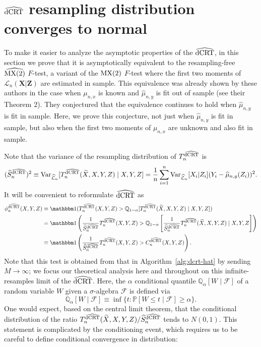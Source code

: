 \documentclass[aos]{imsart}
\theoremstyle{plain}
\theoremstyle{remark}
\newcommand{\V}{\mathrm{Var}}							%
\renewcommand{\P}{\mathbb{P}}							%
\newcommand{\Q}{\mathbb{Q}}								%
\newcommand{\indicator}{\mathbbm 1}						%
\newcommand{\prx}{\bm X}								%
\newcommand{\srx}{X}									%
\newcommand{\prz}{\bm Z}								%
\newcommand{\srz}{Z}									%
\newcommand{\srxk}{\widetilde X}						%
\newcommand{\sry}{Y}									%
\newcommand{\law}{\mathcal L}							%
\newcommand{\lawhat}{\widehat{\mathcal L}}				%
\newcommand{\dCRThat}{\widehat{\textnormal{dCRT}}}		%
\newcommand{\MXtwohat}{\widehat{\textnormal{MX(2)}}}		%
\newcommand{\MXtwo}{\textnormal{MX(2)}}                 %
\begin{document}
\section{$\dCRThat$ resampling distribution converges to normal} \label{sec:conv-to-normal}

To make it easier to analyze the asymptotic properties of the $\dCRThat$, in this section we prove that it is asymptotically equivalent to the resampling-free $\MXtwohat$ $F$-test, a variant of the $\MXtwo$ $F$-test \citep{Katsevich2020a} where the first two moments of $\law_n(\prx|\prz)$ are estimated in sample. This equivalence was already shown by these authors in the case when $\mu_{n,x}$ is known and $\widehat \mu_{n,y}$ is fit out of sample (see their Theorem 2). They conjectured that the equivalence continues to hold when $\widehat \mu_{n,y}$ is fit in sample. Here, we prove this conjecture, not just when $\widehat \mu_{n,y}$ is fit in sample, but also when the first two moments of $\mu_{n,x}$ are unknown and also fit in sample.

Note that the variance of the resampling distribution of $T_n^{\dCRThat}$ is
\begin{equation}
    (\widehat S_{n}^{\dCRThat})^2 \equiv \V_{\lawhat_n}[T_n^{\dCRThat}(\srxk, \srx, \sry, \srz) \mid \srx, \sry, \srz] = \frac{1}{n}\sum_{i = 1}^n \V_{\lawhat_n}[\srx_i|\srz_i](\sry_i - \widehat \mu_{n,y}(\srz_i))^2.
    \label{eq:conditional-variance-def}
\end{equation}
It will be convenient to reformulate $\dCRThat$ as 
\begin{equation*}
    \begin{split}
        \phi^{\dCRThat}_n(\srx, \sry, \srz) &\equiv \indicator(T_n^{\dCRThat}(\srx, \sry, \srz) > \Q_{1-\alpha}[T_n^{\dCRThat}(\srxk, \srx, \sry, \srz) \mid \srx, \sry, \srz]) \\
        &= \indicator\left(\frac{1}{\widehat S_{n}^{\dCRThat}}T_n^{\dCRThat}(\srx, \sry, \srz) > \Q_{1-\alpha}\left[\frac{1}{\widehat S_{n}^{\dCRThat}}T_n^{\dCRThat}(\srxk, \srx, \sry, \srz) \mid \srx, \sry, \srz\right]\right) \\
        &\equiv \indicator\left(\frac{1}{\widehat S_{n}^{\dCRThat}}T_n^{\dCRThat}(\srx, \sry, \srz) > C^{\dCRThat}_n(\srx, \sry, \srz)\right).
    \end{split}
\end{equation*}
Note that this test is obtained from that in Algorithm~\ref{alg:dcrt-hat} by sending $M \rightarrow \infty$; we focus our theoretical analysis here and throughout on this infinite-resamples limit of the $\dCRThat$. Here, the $\alpha$ conditional quantile $\Q_{\alpha}[W \mid \mathcal F]$ of a random variable $W$ given a $\sigma$-algebra $\mathcal F$ is defined via
\begin{equation}
    \mathbb{Q}_{\alpha}[W \mid \mathcal F] \equiv \inf\{t:\P[W \leq t \mid \mathcal F] \geq \alpha\}.
\end{equation}
One would expect, based on the central limit theorem, that the conditional distribution of the ratio $T_n^{\dCRThat}(\srxk, \srx, \sry, \srz)/\widehat S_{n}^{\dCRThat}$ tends to $N(0,1)$. This statement is complicated by the conditioning event, which requires us to be careful to define conditional convergence in distribution:
\end{document}
